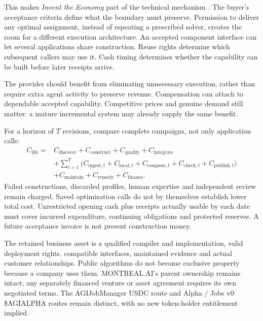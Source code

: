 \documentclass[11pt,letterpaper]{article}
\theoremstyle{definition}\newtheorem{definition}[theorem]{Definition}
\theoremstyle{remark}\newtheorem{remark}[theorem]{Remark}
\begin{document}
This makes \emph{Invent the Economy} part of the technical mechanism \citep{economy}. The buyer's acceptance criteria define what the boundary must preserve. Permission to deliver any optimal assignment, instead of repeating a prescribed solver, creates the room for a different execution architecture. An accepted component interface can let several applications share construction. Reuse rights determine which subsequent callers may use it. Cash timing determines whether the capability can be built before later receipts arrive.

The provider should benefit from eliminating unnecessary execution, rather than require extra agent activity to preserve revenue. Compensation can attach to dependable accepted capability. Competitive prices and genuine demand still matter: a mature incremental system may already supply the same benefit.

For a horizon of $T$ revisions, compare complete campaigns, not only application calls:
\begin{equation}
\begin{aligned}
 C_{\mathrm{life}}={}&C_{\mathrm{discover}}+C_{\mathrm{construct}}+C_{\mathrm{qualify}}+C_{\mathrm{integrate}}\\
 &+\sum_{t=1}^{T}\big(C_{\mathrm{ingest},t}+C_{\mathrm{local},t}
 +C_{\mathrm{compose},t}+C_{\mathrm{check},t}+C_{\mathrm{publish},t}\big)\\
 &+C_{\mathrm{maintain}}+C_{\mathrm{remedy}}+C_{\mathrm{finance}}.
\end{aligned}
\label{eq:life}
\end{equation}
Failed constructions, discarded profiles, human expertise and independent review remain charged. Saved optimization calls do not by themselves establish lower total cost. Unrestricted opening cash plus receipts actually usable by each date must cover incurred expenditure, continuing obligations and protected reserves. A future acceptance invoice is not present construction money.

The retained business asset is a qualified compiler and implementation, valid deployment rights, compatible interfaces, maintained evidence and actual customer relationships. Public algorithms do not become exclusive property because a company uses them. MONTREAL.AI's parent ownership remains intact; any separately financed venture or asset agreement requires its own negotiated terms. The AGIJobManager USDC route and Alpha / Jobs v0 \$AGIALPHA routes remain distinct, with no new token-holder entitlement implied.
\end{document}
